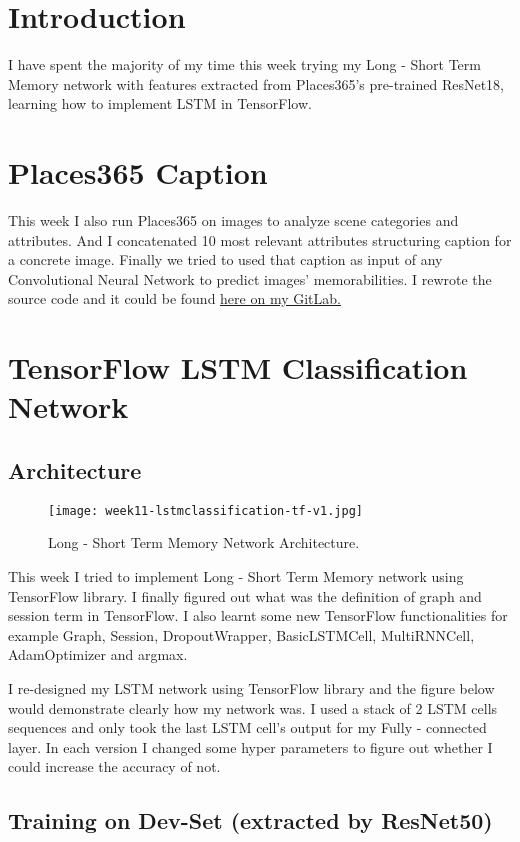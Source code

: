 \section{Introduction}
I have spent the majority of my time this week trying my Long - Short Term Memory network with features extracted from Places365's pre-trained ResNet18, learning how to implement LSTM in TensorFlow.

\section{Places365 Caption}
This week I also run Places365 on images to analyze scene categories and attributes. And I concatenated 10 most relevant attributes structuring caption for a concrete image. Finally we tried to used that caption as input of any Convolutional Neural Network to predict images' memorabilities. I rewrote the source code and it could be found \href{https://gitlab.com/tlvu2697/mit--csail--places365}{here on my GitLab.}

\section{TensorFlow LSTM Classification Network}
\subsection{Architecture}
\begin{figure}[!ht]
\centering
\texttt{[image: week11-lstmclassification-tf-v1.jpg]}
\caption{Long - Short Term Memory Network Architecture.}
\end{figure}

This week I tried to implement Long - Short Term Memory network using TensorFlow library. I finally figured out what was the definition of graph and session term in TensorFlow. I also learnt some new TensorFlow functionalities for example Graph, Session, DropoutWrapper, BasicLSTMCell, MultiRNNCell, AdamOptimizer and argmax.

I re-designed my LSTM network using TensorFlow library and the figure below would demonstrate clearly how my network was. I used a stack of 2 LSTM cells sequences and only took the last LSTM cell's output for my Fully - connected layer. In each version I changed some hyper parameters to figure out whether I could increase the accuracy of not.

\subsection{Training on Dev-Set (extracted by ResNet50)}
